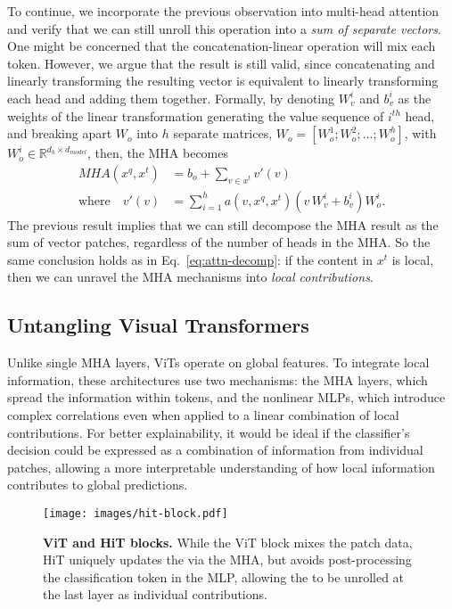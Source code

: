 To continue, we incorporate the previous observation into multi-head attention and verify that we can still unroll this operation into a \emph{sum of separate vectors}. One might be concerned that the concatenation-linear operation will mix each token. However, we argue that the result is still valid, since concatenating and linearly transforming the resulting vector is equivalent to linearly transforming each head and adding them together. 
Formally, by denoting $W_v^i$ and $b_v^i$ as the weights of the linear transformation generating the value sequence of $i^{th}$ head, and breaking apart $W_o$ into $h$ separate matrices, $W_o = [W_o^1; W_o^2; ...; W_o^h]$, with $W_o^i\in\mathbb{R}^{d_k\times d_{model}}$, then, the MHA becomes
\begin{equation}
\begin{split}
    MHA(x^q, x^t) &= b_o + \sum_{v\in x^t} v'(v) \\
    \text{where} \quad v'(v) &= \sum_{i=1}^h a(v, x^q, x^t) (v\,W_v^i+b_v^i) W_o^i.
\end{split}
\end{equation}
The previous result implies that we can still decompose the MHA result as the sum of vector patches, regardless of the number of heads in the MHA. So the same conclusion holds as in Eq.~\ref{eq:attn-decomp}: if the content in $x^t$ is local, then we can unravel the MHA mechanisms into \emph{local contributions}. %

\subsection{Untangling Visual Transformers}\label{sec:presenting-hit}

Unlike single MHA layers, ViTs operate on global features.
To integrate local information, these architectures use two mechanisms: the MHA layers, which spread the information within tokens, and the nonlinear MLPs, which introduce complex correlations even when applied to a linear combination of local contributions. For better explainability, it would be ideal if the classifier's decision could be expressed as a combination of information from individual patches, allowing a more interpretable understanding of how local information contributes to global predictions.

\begin{figure}
    \centering
    \texttt{[image: images/hit-block.pdf]}
    \caption{\textbf{ViT and HiT blocks.} While the ViT block mixes the patch data, HiT uniquely updates the \CLS via the MHA, but avoids post-processing the classification token in the MLP, allowing the \CLS to be unrolled at the last layer as individual contributions.}
    \label{fig:hit}
\end{figure}

